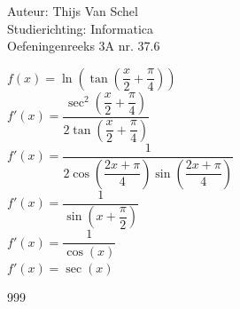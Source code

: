 \documentclass[a4paper]{article}
\begin{document}
  
\noindent \large Auteur: Thijs Van Schel \\
\noindent \large Studierichting: Informatica\\
\noindent \large Oefeningenreeks 3A nr. 37.6\\

\medskip

\normalsize

$f(x) = \ln\left(\tan\left(\dfrac{x}{2}+\dfrac{\pi}{4}\right)\right)$\\

$f'(x) = \dfrac{\sec^2\left(\dfrac{x}{2}+\dfrac{\pi}{4}\right)}{2\tan\left(\dfrac{x}{2}+\dfrac{\pi}{4}\right)}$\\

$f'(x) = \dfrac{1}{2\cos\left(\dfrac{2x+\pi}{4}\right)\sin\left(\dfrac{2x+\pi}{4}\right)}$\\

$f'(x) = \dfrac{1}{\sin\left(x+\dfrac{\pi}{2}\right)}$\\

$f'(x) = \dfrac{1}{\cos(x)}$\\

$f'(x) = \sec(x)$

\begin{thebibliography}{999}
\end{thebibliography}
\end{document}
